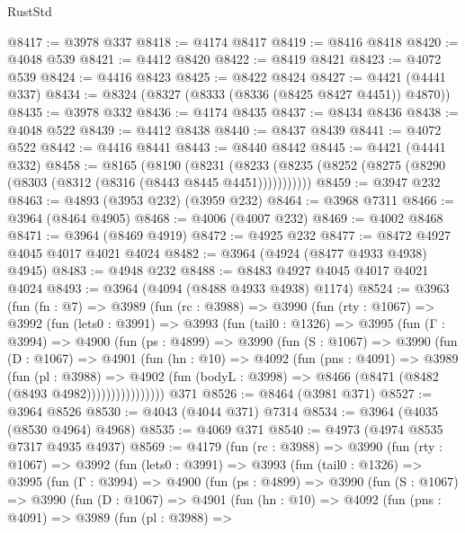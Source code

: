 \begin{lexlean}{RustStd}
\begin{coremodule}
@8417 := @3978 @337
@8418 := @4174 @8417
@8419 := @8416 @8418
@8420 := @4048 @539
@8421 := @4412 @8420
@8422 := @8419 @8421
@8423 := @4072 @539
@8424 := @4416 @8423
@8425 := @8422 @8424
@8427 := @4421 (@4441 @337)
@8434 := @8324 (@8327 (@8333 (@8336 (@8425 @8427 @4451)) @4870))
@8435 := @3978 @332
@8436 := @4174 @8435
@8437 := @8434 @8436
@8438 := @4048 @522
@8439 := @4412 @8438
@8440 := @8437 @8439
@8441 := @4072 @522
@8442 := @4416 @8441
@8443 := @8440 @8442
@8445 := @4421 (@4441 @332)
@8458 := @8165
    (@8190
      (@8231 (@8233 (@8235 (@8252 (@8275 (@8290 (@8303 (@8312 (@8316 (@8443 @8445 @4451)))))))))))
@8459 := @3947 @232
@8463 := @4893 (@3953 @232) (@3959 @232)
@8464 := @3968 @7311
@8466 := @3964 (@8464 @4905)
@8468 := @4006 (@4007 @232)
@8469 := @4002 @8468
@8471 := @3964 (@8469 @4919)
@8472 := @4925 @232
@8477 := @8472 @4927 @4045 @4017 @4021 @4024
@8482 := @3964 (@4924 (@8477 @4933 @4938) @4945)
@8483 := @4948 @232
@8488 := @8483 @4927 @4045 @4017 @4021 @4024
@8493 := @3964 (@4094 (@8488 @4933 @4938) @1174)
@8524 := @3963
    (fun (fn : @7) =>
    @3989
      (fun (rc : @3988) =>
      @3990
        (fun (rty : @1067) =>
        @3992
          (fun (lets0 : @3991) =>
          @3993
            (fun (tail0 : @1326) =>
            @3995
              (fun (Γ : @3994) =>
              @4900
                (fun (ps : @4899) =>
                @3990
                  (fun (S : @1067) =>
                  @3990
                    (fun (D : @1067) =>
                    @4901
                      (fun (hn : @10) =>
                      @4092
                        (fun (pns : @4091) =>
                        @3989
                          (fun (pl : @3988) =>
                          @4902
                            (fun (bodyL : @3998) => @8466 (@8471 (@8482 (@8493 @4982))))))))))))))))
    @371
@8526 := @8464 (@3981 @371)
@8527 := @3964 @8526
@8530 := @4043 (@4044 @371) @7314
@8534 := @3964 (@4035 (@8530 @4964) @4968)
@8535 := @4069 @371
@8540 := @4973 (@4974 @8535 @7317 @4935 @4937)
@8569 := @4179
    (fun (rc : @3988) =>
    @3990
      (fun (rty : @1067) =>
      @3992
        (fun (lets0 : @3991) =>
        @3993
          (fun (tail0 : @1326) =>
          @3995
            (fun (Γ : @3994) =>
            @4900
              (fun (ps : @4899) =>
              @3990
                (fun (S : @1067) =>
                @3990
                  (fun (D : @1067) =>
                  @4901
                    (fun (hn : @10) =>
                    @4092
                      (fun (pns : @4091) =>
                      @3989
                        (fun (pl : @3988) =>

\end{coremodule}
\end{lexlean}

